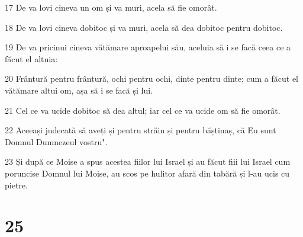 \par 17 De va lovi cineva un om și va muri, acela să fie omorât.
\par 18 De va lovi cineva dobitoc și va muri, acela să dea dobitoc pentru dobitoc.
\par 19 De va pricinui cineva vătămare aproapelui său, aceluia să i se facă ceea ce a făcut el altuia:
\par 20 Frântură pentru frântură, ochi pentru ochi, dinte pentru dinte; cum a făcut el vătămare altui om, așa să i se facă și lui.
\par 21 Cel ce va ucide dobitoc să dea altul; iar cel ce va ucide om să fie omorât.
\par 22 Aceeași judecată să aveți și pentru străin și pentru băștinaș, că Eu sunt Domnul Dumnezeul vostru".
\par 23 Și după ce Moise a spus acestea fiilor lui Israel și au făcut fiii lui Israel cum poruncise Domnul lui Moise, au scos pe hulitor afară din tabără și l-au ucis cu pietre.

\chapter{25}


